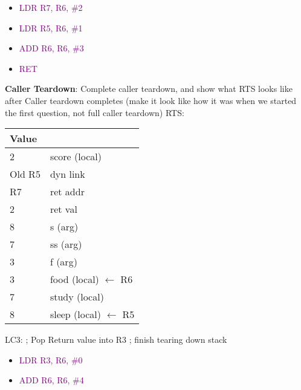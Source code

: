 \documentclass{article}
\begin{document}
\begin{itemize}
    \item \textcolor{purple}{LDR R7, R6, \#2}
    \item \textcolor{purple}{LDR R5, R6, \#1}
    \item \textcolor{purple}{ADD R6, R6, \#3}
    \item \textcolor{purple}{RET}
\end{itemize}


    \textbf{Caller Teardown}: Complete caller teardown, and show what RTS looks like after Caller teardown completes (make it look like how it was when we started the first question, not full caller teardown)
    \newline
RTS:
\begin{center}

\begin{tabular}{|p{3cm} p{5cm} |} 
\hline
 Value &   \\ [0.5ex] 
 \hline \hline
 2 & score (local)  \\
 \hline
 Old R5 & dyn link \\
 \hline
 R7 & ret addr \\
 \hline
 2 & ret val \\
 \hline
 8 & s (arg) \\ 
 \hline
 7 & ss (arg)\\
 \hline
 3 & f (arg) \\
 \hline
 3 & food (local) $\xleftarrow{}$ R6\\
 \hline
 7 & study (local)\\ [1ex]
 \hline
  8 & sleep (local) $\xleftarrow{}$ R5 \\ [1ex]
  \hline
 
\end{tabular}
\end{center}





LC3:
\newline
; Pop Return value into R3
\newline
; finish tearing down stack 
 \begin{itemize}
    \item \textcolor{purple}{LDR R3, R6, \#0}
    \item \textcolor{purple}{ADD R6, R6, \#4}
    
\end{itemize}

\newpage
\end{document}
